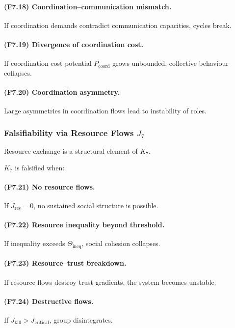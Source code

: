 \paragraph{(F7.18) Coordination–communication mismatch.}
If coordination demands contradict communication capacities,
cycles break.

\paragraph{(F7.19) Divergence of coordination cost.}
If coordination cost potential $P_{\mathrm{coord}}$ grows unbounded,
collective behaviour collapses.

\paragraph{(F7.20) Coordination asymmetry.}
Large asymmetries in coordination flows lead to instability of roles.



\subsubsection{Falsifiability via Resource Flows \texorpdfstring{$J_7$}{J_7}}

Resource exchange is a structural element of $K_7$.

$K_7$ is falsified when:

\paragraph{(F7.21) No resource flows.}
If $J_{\mathrm{res}}=0$, no sustained social structure is possible.

\paragraph{(F7.22) Resource inequality beyond threshold.}
If inequality exceeds $\Theta_{\mathrm{ineq}}$,
social cohesion collapses.

\paragraph{(F7.23) Resource–trust breakdown.}
If resource flows destroy trust gradients,
the system becomes unstable.

\paragraph{(F7.24) Destructive flows.}
If $J_{\mathrm{kill}}>J_{\mathrm{critical}}$,
group disintegrates.

